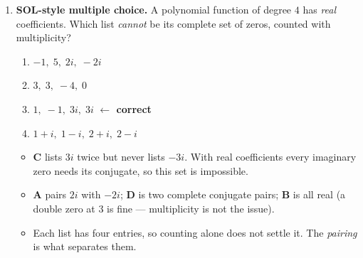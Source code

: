 \documentclass[10pt]{article}
\begin{document}
\begin{enumerate}[leftmargin=1.8em, itemsep=12pt]
  \item \textbf{SOL-style multiple choice.} A polynomial function of degree $4$ has \emph{real}
    coefficients. Which list \emph{cannot} be its complete set of zeros, counted with multiplicity?
    \begin{enumerate}[label=\Alph*., leftmargin=1.9em, itemsep=1pt]
      \item $-1,\; 5,\; 2i,\; -2i$
      \item $3,\; 3,\; -4,\; 0$
      \item $1,\; -1,\; 3i,\; 3i$ \quad \textcolor{keyred}{\textbf{$\leftarrow$ correct}}
      \item $1+i,\; 1-i,\; 2+i,\; 2-i$
    \end{enumerate}
    \begin{itemize}[leftmargin=1.5em, nosep]
      \item \textbf{C} lists $3i$ twice but never lists $-3i$. With real coefficients every imaginary zero needs its conjugate, so this set is impossible.
      \item \textbf{A} pairs $2i$ with $-2i$; \textbf{D} is two complete conjugate pairs; \textbf{B} is all real (a double zero at $3$ is fine --- multiplicity is not the issue).
      \item Each list has four entries, so counting alone does not settle it. The \emph{pairing} is what separates them.
    \end{itemize}
\end{enumerate}
\end{document}
